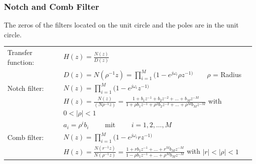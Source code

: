 \subsubsection{Notch and Comb Filter}
The zeros of the filters located on the unit circle and the poles are in the unit
circle.

\begin{tabular}{l l}
	Transfer function: & $H(z) = \frac{N(z)}{D(z)} $
	\\
  & $D(z) = N(\rho^{-1}z)  = \prod\limits_{i=1}^{M}(1- e^{j\omega_i}\rho z^{-1)} \qquad \rho$ = Radius	\\
  
  Notch filter:	
	& $N(z) = \prod\limits_{i=1}^{M}(1- e^{j\omega_i}z^{-1)} $ \\
	& $H(z) = \frac{N(z)}{(N\rho^{-1}z)}= \frac{1+b_1 z^{-1} + b_2z^{-2} + \ldots + b_M z^{-M}}
	{1+\rho b_1 z^{-1} + \rho^2 b_2z^{-2} + \ldots + \rho^M b_M z^{-M}} $ \qquad with $0 < |\rho| < 1$\\
	&$a_i=\rho^ib_i \qquad$ mit $\qquad i=1,2,\ldots,M$ \\
	
	Comb filter:
	& $N(z) = \prod\limits_{i=1}^{M}(1- e^{j\omega_i}rz^{-1)} $ \\
	& $H(z) = \frac{N(r^{-1}z)}{N(\rho^{-1}z)} 
	= \frac{1+rb_1z^{-1}+\ldots+r^Mb_Mz^{-M}}{1-\rho b_1z^{-1}+\ldots+\rho^Mb_Mz^{-M}}$ \qquad with $|r| < |\rho| < 1$ 
	\end{tabular}

\newpage	
